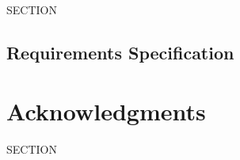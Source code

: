 \documentclass{sigchi}
\begin{document}
SECTION

\subsection{Requirements Specification}

\section{Acknowledgments}

SECTION

%
%
%
%
%
\balance{}



\end{document}

